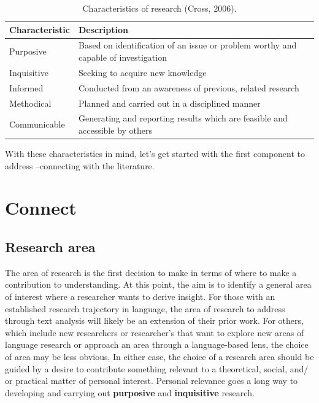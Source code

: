 \documentclass[
  letterpaper,
]{latex/krantz}
\begin{document}
\hypertarget{tbl-fr-cross-research-char-table}{}
\begin{table}
\caption{\label{tbl-fr-cross-research-char-table}Characteristics of research (Cross, 2006). }\tabularnewline

\centering
\begin{tabular}{ll}
\toprule
Characteristic & Description\\
\midrule
Purposive & Based on identification of an issue or problem worthy and capable of investigation\\
Inquisitive & Seeking to acquire new knowledge\\
Informed & Conducted from an awareness of previous, related research\\
Methodical & Planned and carried out in a disciplined manner\\
Communicable & Generating and reporting results which are feasible and accessible by others\\
\bottomrule
\end{tabular}
\end{table}

With these characteristics in mind, let's get started with the first
component to address --connecting with the literature.

\hypertarget{connect}{%
\section{Connect}\label{connect}}

\hypertarget{research-area}{%
\subsection{Research area}\label{research-area}}

The area of research is the first decision to make in terms of where to
make a contribution to understanding. At this point, the aim is to
identify a general area of interest where a researcher wants to derive
insight. For those with an established research trajectory in language,
the area of research to address through text analysis will likely be an
extension of their prior work. For others, which include new researchers
or researcher's that want to explore new areas of language research or
approach an area through a language-based lens, the choice of area may
be less obvious. In either case, the choice of a research area should be
guided by a desire to contribute something relevant to a theoretical,
social, and/ or practical matter of personal interest. Personal
relevance goes a long way to developing and carrying out
\textbf{purposive} and \textbf{inquisitive} research.
\end{document}
